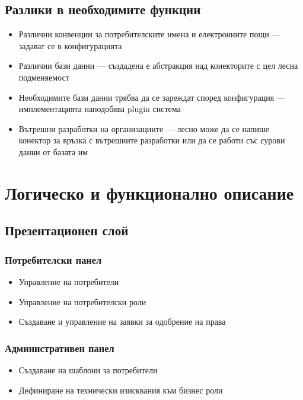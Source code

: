 \documentclass[bulgarian,a4paper,12pt,titlepage]{article}
\begin{document}
        \subsection{Разлики в необходимите функции}
            \begin{itemize}
                \item Различни конвенции за потребителските имена и електронните пощи --- задават се в конфигурацията
                \item Различни бази данни --- създадена е абстракция над конекторите с цел лесна подменяемост
                \item Необходимите бази данни трябва да се зареждат според конфигурация --- имплементацията наподобява plugin система
                \item Вътрешни разработки на организациите --- лесно може да се напише конектор за връзка с вътрешните разработки или да се работи със сурови данни от базата им
            \end{itemize}

    \section{Логическо и функционално описание}
        \subsection{Презентационен слой}
            \subsubsection{Потребителски панел}
                \begin{itemize}
                    \item Управление на потребители
                    \item Управление на потребителски роли
                    \item Създаване и управление на заявки за одобрение на права
                \end{itemize}
            \subsubsection{Административен панел}
                \begin{itemize}
                    \item Създаване на шаблони за потребители
                    \item Дефиниране на технически изисквания към бизнес роли
                \end{itemize}
\end{document}
